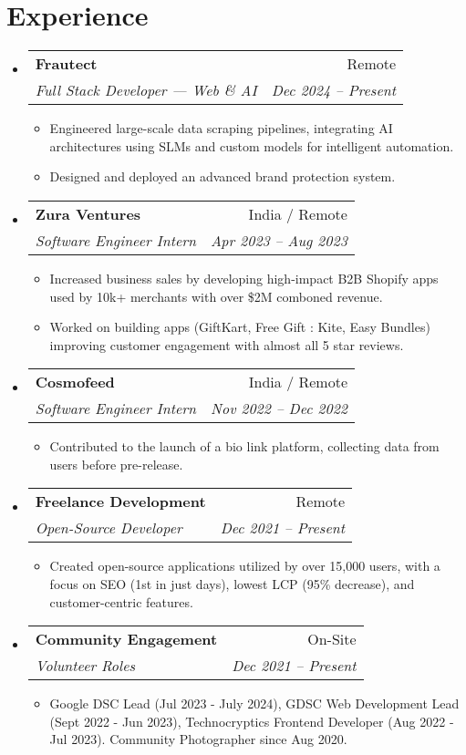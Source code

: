 \documentclass[letterpaper,11pt]{article}
\makeatletter
\newcommand{\resumeItem}[1]{
  \item\small{
    {#1 \vspace{-2pt}}
  }
}
\newcommand{\resumeSubheading}[4]{
  \vspace{-2pt}\item
    \begin{tabular*}{0.97\textwidth}[t]{l@{\extracolsep{\fill}}r}
      \textbf{#1} & #2 \\
      \textit{\small#3} & \textit{\small #4} \\
    \end{tabular*}\vspace{-7pt}
}
\newcommand{\resumeSubHeadingListStart}{\begin{itemize}[leftmargin=0.15in, label={}]}
\newcommand{\resumeSubHeadingListEnd}{\end{itemize}}
\newcommand{\resumeItemListStart}{\begin{itemize}}
\newcommand{\resumeItemListEnd}{\end{itemize}\vspace{-5pt}}
\makeatother
\begin{document}


\section{Experience}
    \resumeSubHeadingListStart
    
    \resumeSubheading{Frautect}{Remote}
    {Full Stack Developer — Web \& AI}{Dec 2024 -- Present}
    \resumeItemListStart
    \resumeItem{Engineered large-scale data scraping pipelines, integrating AI architectures using SLMs and custom models for intelligent automation.}
    \resumeItem{Designed and deployed an advanced brand protection system.}
    \resumeItemListEnd

    \resumeSubheading{Zura Ventures}{India / Remote}
    {Software Engineer Intern}{Apr 2023 -- Aug 2023}
    \resumeItemListStart
    \resumeItem{Increased business sales by developing high-impact B2B Shopify apps used by 10k+ merchants with over \$2M comboned revenue.}
    \resumeItem{Worked on building apps (GiftKart, Free Gift : Kite, Easy Bundles) improving customer engagement with almost all 5 star reviews.}
    \resumeItemListEnd
    
    \resumeSubheading{Cosmofeed}{India / Remote}
    {Software Engineer Intern}{Nov 2022 -- Dec 2022}
    \resumeItemListStart
    \resumeItem{Contributed to the launch of a bio link platform, collecting data from users before pre-release.}
    \resumeItemListEnd
    
    \resumeSubheading{Freelance Development}{Remote}{Open-Source Developer}{Dec 2021 -- Present}
    \resumeItemListStart
    \resumeItem{Created open-source applications utilized by over 15,000 users, with a focus on SEO (1st in just days), lowest LCP (95\% decrease), and customer-centric features.}
    \resumeItemListEnd

    \resumeSubheading{Community Engagement}{On-Site}{Volunteer Roles}{Dec 2021 -- Present}
    \resumeItemListStart
    \resumeItem{Google DSC Lead (Jul 2023 - July 2024), GDSC Web Development Lead (Sept 2022 - Jun 2023), Technocryptics Frontend Developer (Aug 2022 - Jul 2023). Community Photographer since Aug 2020.}
    \resumeItemListEnd

    \resumeSubHeadingListEnd

\end{document}
